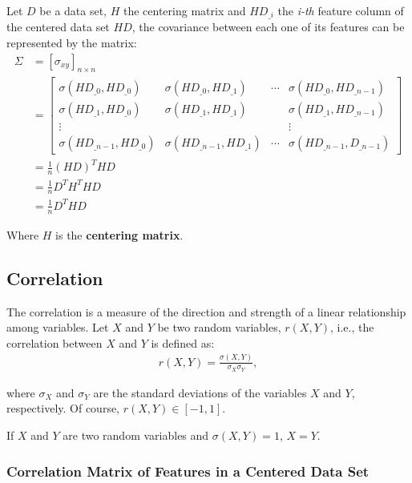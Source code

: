 Let $D$ be a data set, $H$ the centering matrix and $HD_{\_i}$ the {\em i-th} feature column of the centered data set $HD$, the covariance between each one of its features can be represented by the matrix:
\begin{align*}
\Sigma &= [\sigma_{xy}]_{n \times n} \\
&= \begin{bmatrix}
\sigma(HD_{\_0}, HD_{\_0}) & \sigma(HD_{\_0}, HD_{\_1}) & \cdots & \sigma(HD_{\_0}, HD_{\_n-1}) \\
\sigma(HD_{\_1}, HD_{\_0}) & \sigma(HD_{\_1}, HD_{\_1}) & & \sigma(HD_{\_1}, HD_{\_n-1}) \\
\vdots &&& \vdots \\
\sigma(HD_{\_n-1}, HD_{\_0}) & \sigma(HD_{\_n-1}, HD_{\_1}) & \cdots & \sigma(HD_{\_n-1}, D_{\_n-1})
\end{bmatrix} \\
&= \frac{1}{n} (HD)^T HD \\
&= \frac{1}{n} D^T H^T H D \\
 &= \frac{1}{n} D^T H D
\end{align*}

Where $H$ is the \textbf{centering matrix}.

\subsection{Correlation}

The correlation is a measure of the direction and strength of a linear relationship among variables. Let $X$ and $Y$ be two random variables, $r(X, Y)$, i.e., the correlation between $X$ and $Y$ is defined as: \cite{ross2010introductory}
\begin{align*}
	r(X, Y) = \frac{\sigma(X, Y)}{\sigma_X \sigma_Y},
\end{align*}

where $\sigma_X$ and $\sigma_Y$ are the standard deviations of the variables $X$ and $Y$, respectively. Of course, $r(X, Y) \in [-1, 1]$.

\begin{remark}
	If $X$ and $Y$ are two random variables and $\sigma(X, Y) = 1$, $X=Y$.
\end{remark}

\subsubsection{Correlation Matrix of Features in a Centered Data Set}

